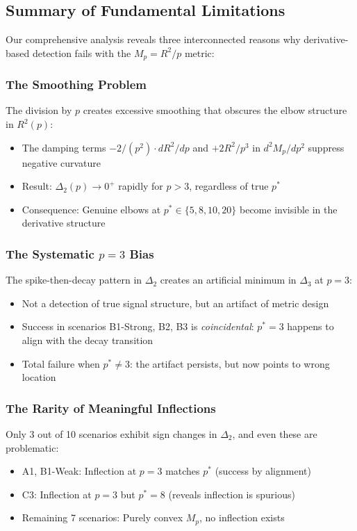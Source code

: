 \documentclass[11pt,a4paper]{article}
\begin{document}
\subsection{Summary of Fundamental Limitations}

Our comprehensive analysis reveals three interconnected reasons why derivative-based detection fails with the $M_p = R^2/p$ metric:

\subsubsection{The Smoothing Problem}

The division by $p$ creates excessive smoothing that obscures the elbow structure in $R^2(p)$:
\begin{itemize}
\item The damping terms $-2/(p^2) \cdot dR^2/dp$ and $+2R^2/p^3$ in $d^2M_p/dp^2$ suppress negative curvature
\item Result: $\Delta_2(p) \to 0^+$ rapidly for $p > 3$, regardless of true $p^*$
\item Consequence: Genuine elbows at $p^* \in \{5, 8, 10, 20\}$ become invisible in the derivative structure
\end{itemize}

\subsubsection{The Systematic $p = 3$ Bias}

The spike-then-decay pattern in $\Delta_2$ creates an artificial minimum in $\Delta_3$ at $p = 3$:
\begin{itemize}
\item Not a detection of true signal structure, but an artifact of metric design
\item Success in scenarios B1-Strong, B2, B3 is \emph{coincidental}: $p^* = 3$ happens to align with the decay transition
\item Total failure when $p^* \neq 3$: the artifact persists, but now points to wrong location
\end{itemize}

\subsubsection{The Rarity of Meaningful Inflections}

Only 3 out of 10 scenarios exhibit sign changes in $\Delta_2$, and even these are problematic:
\begin{itemize}
\item A1, B1-Weak: Inflection at $p = 3$ matches $p^*$ (success by alignment)
\item C3: Inflection at $p = 3$ but $p^* = 8$ (reveals inflection is spurious)
\item Remaining 7 scenarios: Purely convex $M_p$, no inflection exists
\end{itemize}
\end{document}
